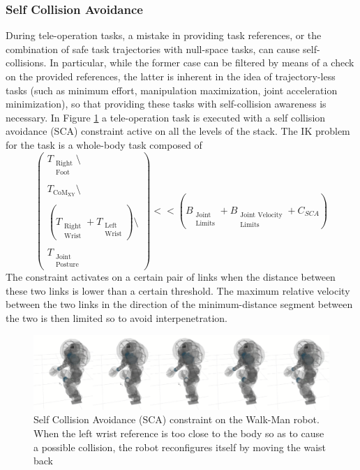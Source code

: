 \subsubsection{Self Collision Avoidance} 
During tele-operation tasks, a mistake in providing task references, or the combination of safe task trajectories with null-space tasks, can cause self-collisions. In particular, while the former case can be filtered by means of a check on the provided references, the latter is inherent in the idea of trajectory-less tasks (such as minimum effort, manipulation maximization, joint acceleration minimization), so that providing these tasks with self-collision awareness is necessary. In Figure \ref{fig:sca} a tele-operation task is executed with a self collision avoidance (SCA) constraint active on all the levels of the stack.
The IK problem for the task is a whole-body task composed of
\begin{equation}
\begin{pmatrix}
T_{\substack{\text{Right}\\\text{Foot}}}\setminus\\
\\
T_{\text{CoM}_\text{XY}}\setminus\\ 
\\
\left(T_{\substack{\text{Right}\\\text{Wrist}}} + T_{\substack{\text{Left}\\\text{Wrist}}}\right)\setminus\\ 
\\
T_{\substack{\text{Joint}\\\text{Posture}}}
\end{pmatrix}
<< \left(B_{\substack{\text{Joint}\\\text{Limits}}} + B_{\substack{\text{Joint Velocity}\\\text{Limits}}} + C_{SCA}\right)
\end{equation}
The constraint activates on a certain pair of links when the distance between these two links is lower than a certain threshold. The maximum relative velocity between the two links in the direction of the minimum-distance segment between the two is then limited so to avoid interpenetration.

\begin{figure}[!h]
\vspace{2 mm}
\centering
\includegraphics[width=\textwidth]{images/sca/sca}
\caption{Self Collision Avoidance (SCA) constraint on the Walk-Man robot.  When the left wrist reference is too close to the body so as to cause a possible collision, the robot reconfigures itself by moving the waist back}
\label{fig:sca}
\end{figure}

